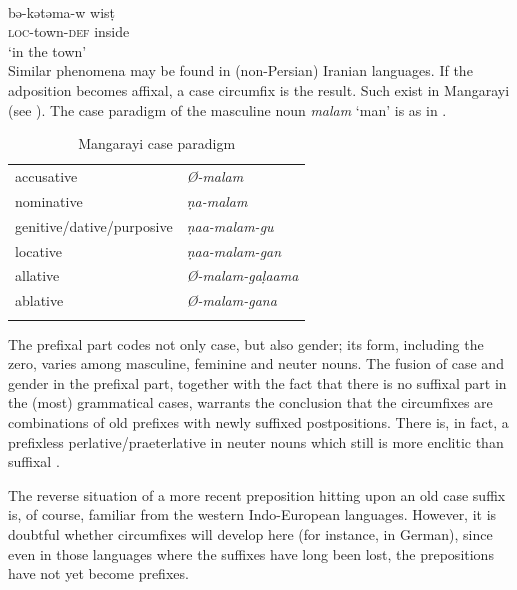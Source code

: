 \ea\label{ex:E75}
\langinfo{\LangAmh}{}{} \\
\gll   bə-kətəma-w  wis\d{t}  \\
\textsc{loc}-town-\textsc{def}  inside\\
\glt  ‘in the town’\\
\z
\noindent Similar phenomena may be found in (non-Persian) Iranian languages. If the adposition becomes affixal, a case circumfix is the result. Such exist in Mangarayi (see \citealt[57--59]{Merlan1982}). The case paradigm of the masculine noun \textit{malam} ‘man’ is as in .

\begin{table}
\begin{tabular}{ll}
\lsptoprule
accusative & \itshape Ø-malam\\
nominative & \itshape \d{n}a-malam\\
genitive/dative/purposive & \itshape \d{n}aa-malam-gu\\
locative & \itshape \d{n}aa-malam-gan\\
allative & \itshape Ø-malam-ga\d{l}aama\\
ablative & \itshape Ø-malam-gana\\
\lspbottomrule
\end{tabular}
\caption{Mangarayi case paradigm}\label{tab:Mangarayi}
\end{table}

The prefixal part codes not only case, but also gender; its form, including the zero, varies among masculine, feminine and neuter nouns. The fusion of case and gender in the prefixal part, together with the fact that there is no suffixal part in the (most) grammatical cases, warrants the conclusion that the circumfixes are combinations of old prefixes with newly suffixed postpositions. There is, in fact, a prefixless perlative/praeterlative in neuter nouns which still is more enclitic than suffixal \citep[59]{Merlan1982}.

The reverse situation of a more recent preposition hitting upon an old case suffix is, of course, familiar from the western Indo-European languages. However, it is doubtful whether circumfixes will develop here (for instance, in German), since even in those languages where the suffixes have long been lost, the prepositions have not yet become prefixes.

